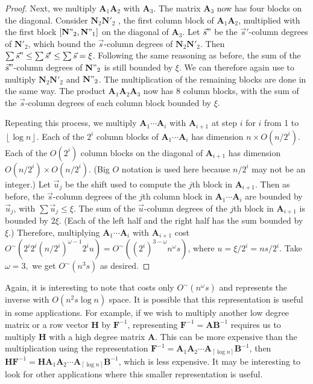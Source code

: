 \begin{proof}
Next, we multiply $\mathbf{A}_{1}\mathbf{A}_{2}$ with $\mathbf{A}_{3}$.
The matrix $\mathbf{A}_{3}$ now has four blocks on the diagonal.
Consider $\mathbf{N}_{2}\mathbf{N}'_{2}$ , the first column block
of $\mathbf{A}_{1}\mathbf{A}_{2}$, multiplied with the first block
$\left[\mathbf{N}"_{2},\mathbf{N}"_{1}\right]$ on the diagonal of
$\mathbf{A}_{3}$. Let $\vec{s}"$ be the $\vec{s}'$-column degrees
of $\mathbf{N}'_{2}$, which bound the $\vec{s}$-column degrees of
$\mathbf{N}_{2}\mathbf{N}'_{2}$. Then $\sum\vec{s}"\le\sum\vec{s}'\le\sum\vec{s}=\xi$.
Following the same reasoning as before, the sum of the $\vec{s}"$-column
degrees of $\mathbf{N}"_{2}$ is still bounded by $\xi$. We can therefore
again use  to multiply
$\mathbf{N}_{2}\mathbf{N}'_{2}$ and $\mathbf{N}"_{2}$. The multiplication
of the remaining blocks are done in the same way. The product $\mathbf{A}_{1}\mathbf{A}_{2}\mathbf{A}_{3}$
now has 8 column blocks, with the sum of the $\vec{s}$-column degrees
of each column block bounded by $\xi$.

Repeating this process, we multiply $\mathbf{A}_{1}\cdots\mathbf{A}_{i}$
with $\mathbf{A}_{i+1}$ at step $i$ for $i$ from 1 to $\left\lfloor \log n\right\rfloor $.
Each of the $2^{i}$ column blocks of $\mathbf{A}_{1}\cdots\mathbf{A}_{i}$
has dimension $n\times O(n/2^{i})$. Each of the $O(2^{i})$ column
blocks on the diagonal of $\mathbf{A}_{i+1}$ has dimension $O(n/2^{i})\times O(n/2^{i})$.
(Big $O$ notation is used here because $n/2^{i}$ may not be an integer.)
Let $\vec{u}_{j}$ be the shift used to compute the $j$th block in
$\mathbf{A}_{i+1}$. Then as before, the $\vec{s}$-column degrees
of the $j$th column block in $\mathbf{A}_{1}\cdots\mathbf{A}_{i}$
are bounded by $\vec{u}_{j}$, with $\sum\vec{u}_{j}\le\xi$. The
sum of the $\vec{u}$-column degrees of the $j$th block in $\mathbf{A}_{i+1}$
is bounded by $2\xi$. (Each of the left half and the right half has
the sum bounded by $\xi$.) Therefore, multiplying $\mathbf{A}_{1}\cdots\mathbf{A}_{i}$
with $\mathbf{A}_{i+1}$ cost $O^{\sim}\left(2^{i}2^{i}\left(n/2^{i}\right)^{\omega-1}2^{i}u\right)=O^{\sim}\left(\left(2^{i}\right)^{3-\omega}n^{\omega}s\right)$,
where $u=\xi/2^{i}=ns/2^{i}$. Take $\omega=3,$ we get $O^{\sim}\left(n^{3}s\right)$
as desired.
\end{proof}
Again, it is interesting to note that 
costs only $O^{\sim}\left(n^{\omega}s\right)$ and represents the
inverse with $O\left(n^{2}s\log n\right)$ space. It is possible that
this representation is useful in some applications. For example, if
we wish to multiply another low degree matrix or a row vector $\mathbf{H}$
by $\mathbf{F}^{-1}$, representing $\mathbf{F}^{-1}=\mathbf{A}\mathbf{B}^{-1}$
requires us to multiply $\mathbf{H}$ with a high degree matrix $\mathbf{A}$.
This can be more expensive than the multiplication using the representation
$\mathbf{F}^{-1}=\mathbf{A}_{1}\mathbf{A}_{2}\cdots\mathbf{A}_{\left\lceil \log n\right\rceil }\mathbf{B}^{-1}$,
then $\mathbf{H}\mathbf{F}^{-1}=\mathbf{H}\mathbf{A}_{1}\mathbf{A}_{2}\cdots\mathbf{A}_{\left\lceil \log n\right\rceil }\mathbf{B}^{-1}$,
which is less expensive. It may be interesting to look for other applications
where this smaller representation is useful.
